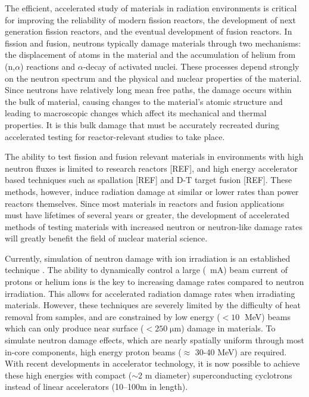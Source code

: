 \documentclass[final,3p,times,twocolumn]{elsarticle} %
\begin{document}
The efficient, accelerated study of materials in radiation environments is critical for improving the reliability of modern fission reactors, the 
development of next generation fission reactors, and the eventual development of fusion reactors.  In fission and fusion, neutrons typically damage 
materials through two mechanisms: the displacement of atoms in the material and the accumulation of helium from (n,$\alpha$) reactions and 
$\alpha$-decay of activated nuclei.  These processes depend strongly on the neutron spectrum and the physical and nuclear properties of the material.  
Since neutrons have relatively long mean free paths, the damage occurs within the bulk of material, causing changes to the material's atomic structure 
and leading to macroscopic changes which affect its mechanical and thermal properties. It is this bulk damage that must be accurately recreated during 
accelerated testing for reactor-relevant studies to take place.

The ability to test fission and fusion relevant materials in environments with high neutron fluxes is limited to research reactors [REF], and high 
energy accelerator based techniques such as spallation [REF] and D-T target fusion [REF].  These methods, however, induce radiation damage at similar 
or lower rates than power reactors themselves.  Since most materials in reactors and fusion applications must have lifetimes of several years or 
greater, the development of accelerated methods of testing materials with increased neutron or neutron-like damage rates will greatly benefit the field 
of nuclear material science.

Currently, simulation of neutron damage with ion irradiation is an established technique \cite{Was,ASTME521}.  The ability to dynamically control a 
large (~mA) beam current of protons or helium ions is the key to increasing damage rates compared to neutron irradiation. This allows for accelerated 
radiation damage rates when irradiating materials.  However, these techniques are severely limited by the difficulty of heat removal from samples, and 
are constrained by low energy ($<10\;$ MeV) beams which can only produce near surface ($<250\;\mathrm{\mu m}$) damage in materials.  To simulate 
neutron damage effects, which are nearly spatially uniform through most in-core components, high energy proton beams ($\approx$ 30-40 MeV) are 
required. With recent developments in accelerator technology, it is now possible to achieve these high energies with compact ($\sim$2 m diameter) 
superconducting cyclotrons instead of linear accelerators (10--100m in length).
\end{document}
